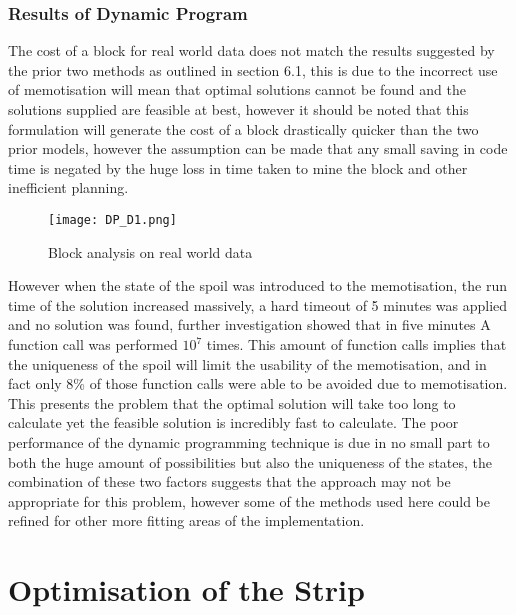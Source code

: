 \subsubsection{Results of Dynamic Program }
The cost of a block for real world data does not match the results suggested by the prior two methods as outlined in section 6.1, this is due to the incorrect use of memotisation will mean that optimal solutions cannot be found and the solutions supplied are feasible at best, however it should be noted that this formulation will generate the cost of a block drastically quicker than the two prior models, however the assumption can be made that any small saving in code time is negated by the huge loss in time taken to mine the block and other inefficient planning. 
\begin{figure}[h]
\caption{Block analysis on real world data }
\label{DP1}
\texttt{[image: DP\_D1.png]}
\end{figure}
However when the state of the spoil was introduced to the memotisation, the run time of the solution increased massively, a hard timeout of 5 minutes was applied and no solution was found, further investigation showed that in five minutes A function call was performed $10^7$ times. This amount of function calls implies that the uniqueness of the spoil will limit the usability of the memotisation, and in fact only 8\% of those function calls were able to be avoided due to memotisation. This presents the problem that the optimal solution will take too long to calculate yet the feasible solution is incredibly fast to calculate. The poor performance of the dynamic programming technique is due in no small part to both the huge amount of possibilities but also the uniqueness of the states, the combination of these two factors suggests that the approach may not be appropriate for this problem, however some of the methods used here could be refined for other more fitting areas of the implementation.  

\section{Optimisation of the Strip}
